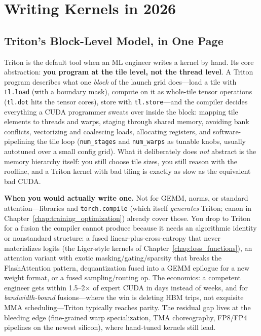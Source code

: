 \section{Writing Kernels in 2026}
\label{sec:kernels_2026}

\subsection{Triton's Block-Level Model, in One Page}

Triton is the default tool when an ML engineer writes a kernel by hand. Its core abstraction: \textbf{you program at the tile level, not the thread level}. A Triton program describes what one \textit{block} of the launch grid does---load a tile with \texttt{tl.load} (with a boundary mask), compute on it as whole-tile tensor operations (\texttt{tl.dot} hits the tensor cores), store with \texttt{tl.store}---and the compiler decides everything a CUDA programmer sweats over inside the block: mapping tile elements to threads and warps, staging through shared memory, avoiding bank conflicts, vectorizing and coalescing loads, allocating registers, and software-pipelining the tile loop (\texttt{num\_stages} and \texttt{num\_warps} as tunable knobs, usually autotuned over a small config grid). What it deliberately does \textit{not} abstract is the memory hierarchy itself: you still choose tile sizes, you still reason with the roofline, and a Triton kernel with bad tiling is exactly as slow as the equivalent bad CUDA.

\textbf{When you would actually write one.} Not for GEMM, norms, or standard attention---libraries and \texttt{torch.compile} (which itself \textit{generates} Triton; canon in Chapter~\ref{chap:training_optimization}) already cover those. You drop to Triton for a fusion the compiler cannot produce because it needs an algorithmic identity or nonstandard structure: a fused linear-plus-cross-entropy that never materializes logits (the Liger-style kernels of Chapter~\ref{chap:loss_functions}), an attention variant with exotic masking/gating/sparsity that breaks the FlashAttention pattern, dequantization fused into a GEMM epilogue for a new weight format, or a fused sampling/routing op. The economics: a competent engineer gets within 1.5--2$\times$ of expert CUDA in days instead of weeks, and for \textit{bandwidth-bound} fusions---where the win is deleting HBM trips, not exquisite MMA scheduling---Triton typically reaches parity. The residual gap lives at the bleeding edge (fine-grained warp specialization, TMA choreography, FP8/FP4 pipelines on the newest silicon), where hand-tuned kernels still lead.

